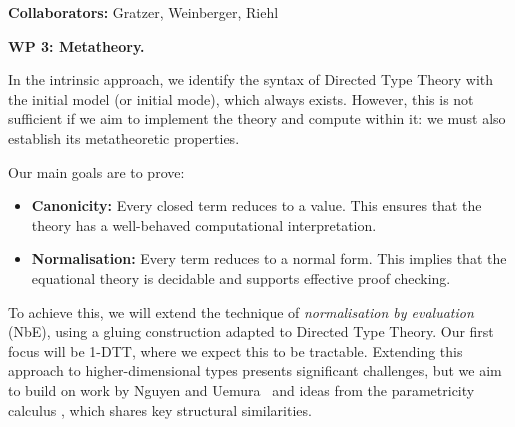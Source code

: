 \documentclass[a4paper,11pt]{article}
\renewcommand{\paragraph}[1]{\textbf{#1.}}
\begin{document}
\textbf{Collaborators:} Gratzer, Weinberger, Riehl





\paragraph{WP 3: Metatheory}

In the intrinsic approach, we identify the syntax of Directed Type
Theory with the initial model (or initial mode), which always
exists. However, this is not sufficient if we aim to implement the
theory and compute within it: we must also establish its metatheoretic
properties.

Our main goals are to prove:
\begin{itemize}
\item \textbf{Canonicity:} Every closed term reduces to a value. This
  ensures that the theory has a well-behaved computational
  interpretation.
\item \textbf{Normalisation:} Every term reduces to a normal
  form. This implies that the equational theory is decidable and
  supports effective proof checking.
\end{itemize}

To achieve this, we will extend the technique of \emph{normalisation
  by evaluation} (NbE), using a gluing construction adapted to
Directed Type Theory. Our first focus will be 1-DTT, where we expect
this to be tractable. Extending this approach to higher-dimensional
types presents significant challenges, but we aim to build on
work by Nguyen and Uemura~\cite{uemura:2025} and ideas
from the parametricity calculus \cite{popl-paper}, which shares key structural
similarities.
\end{document}
